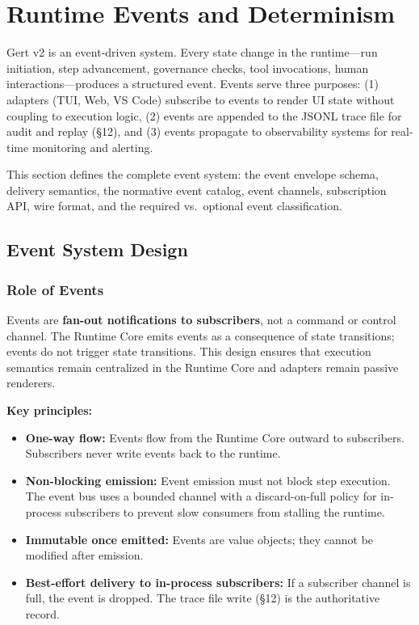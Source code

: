 \chapter{Runtime Events and Determinism}
\label{ch:events}

Gert v2 is an event-driven system. Every state change in the runtime---run initiation, step advancement, governance checks, tool invocations, human interactions---produces a structured event. Events serve three purposes: (1) adapters (TUI, Web, VS Code) subscribe to events to render UI state without coupling to execution logic, (2) events are appended to the JSONL trace file for audit and replay (§12), and (3) events propagate to observability systems for real-time monitoring and alerting.

This section defines the complete event system: the event envelope schema, delivery semantics, the normative event catalog, event channels, subscription API, wire format, and the required vs.\ optional event classification.

\section{Event System Design}

\subsection{Role of Events}

Events are \textbf{fan-out notifications to subscribers}, not a command or control channel. The Runtime Core emits events as a consequence of state transitions; events do not trigger state transitions. This design ensures that execution semantics remain centralized in the Runtime Core and adapters remain passive renderers.

\textbf{Key principles:}
\begin{itemize}
  \item \textbf{One-way flow:} Events flow from the Runtime Core outward to subscribers. Subscribers never write events back to the runtime.
  \item \textbf{Non-blocking emission:} Event emission must not block step execution. The event bus uses a bounded channel with a discard-on-full policy for in-process subscribers to prevent slow consumers from stalling the runtime.
  \item \textbf{Immutable once emitted:} Events are value objects; they cannot be modified after emission.
  \item \textbf{Best-effort delivery to in-process subscribers:} If a subscriber channel is full, the event is dropped. The trace file write (§12) is the authoritative record.
\end{itemize}

